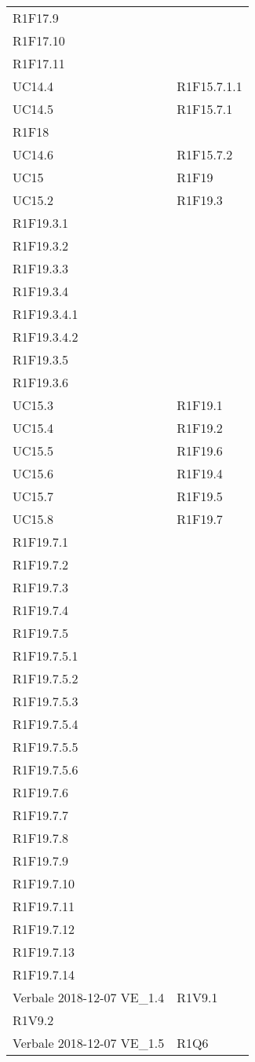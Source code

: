 \begin{longtable}{ >{\centering}p{}
			>{\centering}p{}}
		R1F17.9\\
		R1F17.10\\
		R1F17.11	\tabularnewline
		UC14.4	&	R1F15.7.1.1	\tabularnewline
		UC14.5	&	R1F15.7.1\\
		R1F18	\tabularnewline
		UC14.6	&	R1F15.7.2	\tabularnewline
		UC15	&	R1F19	\tabularnewline
		UC15.2	&	R1F19.3\\
		R1F19.3.1\\
		R1F19.3.2\\
		R1F19.3.3\\
		R1F19.3.4\\
		R1F19.3.4.1\\
		R1F19.3.4.2\\
		R1F19.3.5\\
		R1F19.3.6	\tabularnewline
		UC15.3	&	R1F19.1	\tabularnewline
		UC15.4	&	R1F19.2	\tabularnewline
		UC15.5	&	R1F19.6	\tabularnewline
		UC15.6	&	R1F19.4	\tabularnewline
		UC15.7	&	R1F19.5	\tabularnewline
		UC15.8	&	R1F19.7\\
		R1F19.7.1\\
		R1F19.7.2\\
		R1F19.7.3\\
		R1F19.7.4\\
		R1F19.7.5\\
		R1F19.7.5.1\\
		R1F19.7.5.2\\
		R1F19.7.5.3\\
		R1F19.7.5.4\\
		R1F19.7.5.5\\
		R1F19.7.5.6\\
		R1F19.7.6\\
		R1F19.7.7\\
		R1F19.7.8\\
		R1F19.7.9\\
		R1F19.7.10\\
		R1F19.7.11\\
		R1F19.7.12\\
		R1F19.7.13\\
		R1F19.7.14	\tabularnewline
		Verbale 2018-12-07 VE\_1.4	&	R1V9.1\\
		R1V9.2	\tabularnewline
		Verbale 2018-12-07 VE\_1.5	&	R1Q6	\tabularnewline
		
		
	\end{longtable}
